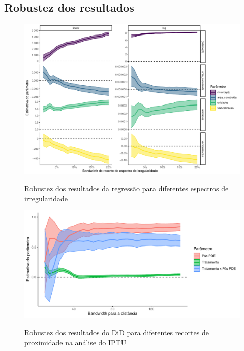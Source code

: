 \begin{apendicesenv}
\chapter{Robustez dos resultados}
\label{appendix:robustez}

\begin{figure}[!h]
    \centering
    \caption{Robustez dos resultados da regressão para diferentes espectros de irregularidade}
    \includegraphics[width = \linewidth]{figuras/robustez-regressao1pop.pdf}
    \label{fig:robustez-reg1}
\end{figure}


\begin{figure}[!h]
    \centering
    \caption{Robustez dos resultados do DiD para diferentes recortes de proximidade na análise do IPTU}
    \includegraphics[width = \linewidth]{figuras/did-IPTU-bandas.pdf}
    \label{fig:robustez-did-IPTU}
\end{figure}


\end{apendicesenv}

